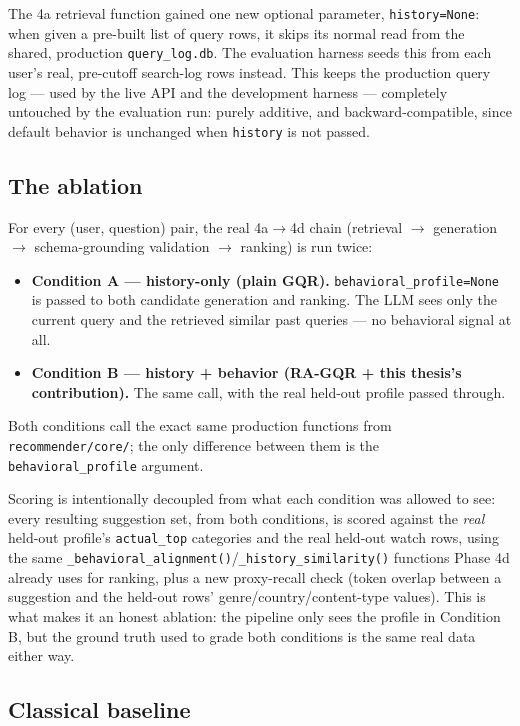 \documentclass[11pt,a4paper]{article}
\newcommand{\code}[1]{\texttt{#1}}
\begin{document}
The 4a retrieval function gained one new optional parameter, \code{history=None}: when given a
pre-built list of query rows, it skips its normal read from the shared, production
\code{query\_log.db}. The evaluation harness seeds this from each user's real, pre-cutoff search-log
rows instead. This keeps the production query log --- used by the live API and the development
harness --- completely untouched by the evaluation run: purely additive, and backward-compatible,
since default behavior is unchanged when \code{history} is not passed.

\subsection{The ablation}

For every (user, question) pair, the real 4a$\to$4d chain (retrieval $\to$ generation $\to$
schema-grounding validation $\to$ ranking) is run twice:

\begin{itemize}
    \item \textbf{Condition A --- history-only (plain GQR).} \code{behavioral\_profile=None} is
        passed to both candidate generation and ranking. The LLM sees only the current query and
        the retrieved similar past queries --- no behavioral signal at all.
    \item \textbf{Condition B --- history + behavior (RA-GQR + this thesis's contribution).} The
        same call, with the real held-out profile passed through.
\end{itemize}

Both conditions call the exact same production functions from \code{recommender/core/}; the only
difference between them is the \code{behavioral\_profile} argument.

Scoring is intentionally decoupled from what each condition was allowed to see: every resulting
suggestion set, from both conditions, is scored against the \emph{real} held-out profile's
\code{actual\_top} categories and the real held-out watch rows, using the same
\code{\_behavioral\_alignment()}/\code{\_history\_similarity()} functions Phase 4d already uses for
ranking, plus a new proxy-recall check (token overlap between a suggestion and the held-out rows'
genre/country/content-type values). This is what makes it an honest ablation: the pipeline only
sees the profile in Condition B, but the ground truth used to grade both conditions is the same
real data either way.

\subsection{Classical baseline}
\end{document}
